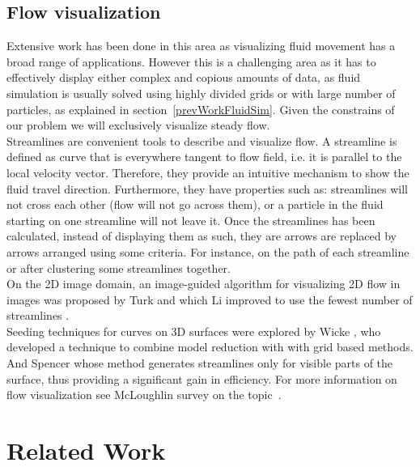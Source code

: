 \documentclass[11pt]{report}
\begin{document}
\subsection{Flow visualization}

Extensive work has been done in this area as visualizing fluid movement has a broad range of applications.
However this is a challenging area as it has to effectively display either complex and copious amounts of data, as fluid simulation is usually solved using highly divided grids or with large number of particles, as explained in section~\ref{prevWorkFluidSim}.
Given the constrains of our problem we will exclusively visualize steady flow.\\

Streamlines are convenient tools to describe and visualize flow.
A streamline is defined as curve that is everywhere tangent to flow field, i.e. it is parallel to the local velocity vector.
Therefore, they provide an intuitive mechanism to show the fluid travel direction.
Furthermore, they have properties such as: streamlines will not cross each other (flow will not go across them), or a particle in the fluid starting on one streamline will not leave it.
Once the streamlines has been calculated, instead of displaying them as such, they are arrows are replaced by arrows arranged using some criteria.
For instance, on the path of each streamline or after clustering some streamlines together.\\

On the 2D image domain, an image-guided algorithm for visualizing 2D flow in images was proposed by Turk \cite{Turk1996} and which Li improved to use the fewest number of streamlines \cite{Li2008}. \\

Seeding techniques for curves on 3D surfaces were explored by Wicke \cite{Wicke2009}, who developed a technique to combine model reduction with with grid based methods.
And Spencer \cite{Spencer2009} whose method generates streamlines only for visible parts of the surface, thus providing a significant gain in efficiency.
For more information on flow visualization see McLoughlin survey on the topic~\cite{McLoughlin2010}.

\section{Related Work}
\end{document}
